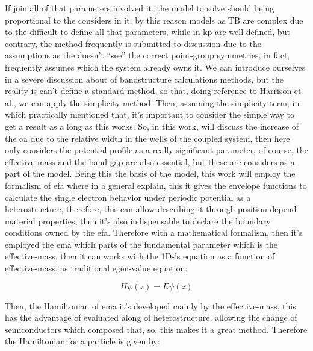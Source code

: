 If join all of that parameters involved it, the model to solve should being proportional to the considers in it, by this reason models as \gls{TB} are complex due to the difficult to define all that parameters, while in \gls{kp} are well-defined, but contrary, the method frequently is  submitted to discussion due to the assumptions as the doesn't ``see'' the correct point-group symmetries, in fact, frequently assumes which the system already owns it.  We can introduce ourselves in a severe discussion about of bandstructure calculations methods, but the reality is can't define a standard method, so that, doing reference to Harrison et al.\cite{harrison2016quantum}, we can apply the simplicity method.
Then, assuming the simplicity term, in which practically mentioned that, it's important to consider the simple way to get a result as a long as this works. So, in this work, will discuss the increase of the  \gls{oa}  due to the relative width in the wells of the coupled system, then here only considers the potential profile as a really significant parameter, of course, the effective mass and   the band-gap are also essential, but these are considers as a part of the model. Being this the basis of the model, this work will employ the formalism of \gls{efa} where in a general explain, this it  gives the envelope functions to calculate the single electron behavior under periodic potential as a heterostructure, therefore, this can allow describing it  through position-depend material properties\cite{foreman1996envelope,benduke1966spacecharge,bastard1990wave}, then it's also indispensable to declare the boundary conditions owned by the \gls{efa}. Therefore with a mathematical formalism, then it's employed the \gls{ema} which parts of the fundamental  parameter which is the effective-mass, then it can works with the 1D-\sch's equation as a function of effective-mass, as traditional egen-value equation:

\begin{equation}\label{eqn:chapter2-sec-numerical-calculations-eigen-value-equation}
	H\psi(z)=E\psi(z)
\end{equation}

Then, the Hamiltonian of \gls{ema} it's developed mainly by the effective-mass, this has the advantage of evaluated along of heterostructure,  allowing  the change of semiconductors which composed that, so, this makes it a great method. Therefore the Hamiltonian for a particle is given by\cite{kamizato1989excitons,bastard1990wave,foreman1996envelope}:

